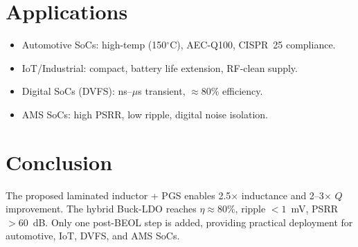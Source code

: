 \documentclass[conference]{IEEEtran}
\begin{document}
\section{Applications}
\begin{itemize}
    \item Automotive SoCs: high-temp (150$^\circ$C), AEC-Q100, CISPR~25 compliance.
    \item IoT/Industrial: compact, battery life extension, RF-clean supply.
    \item Digital SoCs (DVFS): ns--$\mu$s transient, $\approx80$\% efficiency.
    \item AMS SoCs: high PSRR, low ripple, digital noise isolation.
\end{itemize}

\section{Conclusion}
The proposed laminated inductor + PGS enables 2.5$\times$ inductance and 2--3$\times$ $Q$ improvement. 
The hybrid Buck-LDO reaches $\eta\approx80$\%, ripple $<1$~mV, PSRR $>60$~dB. 
Only one post-BEOL step is added, providing practical deployment for automotive, IoT, DVFS, and AMS SoCs.
\end{document}
